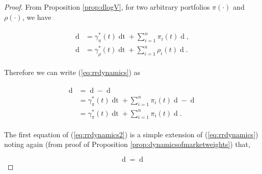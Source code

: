 \documentclass[british]{amsart} \usepackage{lmodern}
\numberwithin{equation}{section} \numberwithin{figure}{section}
\theoremstyle{plain} \newtheorem{thm}{\protect\theoremname}[section]
\theoremstyle{definition} \newtheorem{defn}[thm]{\protect\definitionname}
\theoremstyle{plain} \newtheorem{assumption}[thm]{\protect\assumptionname}
\theoremstyle{plain} \newtheorem{lem}[thm]{\protect\lemmaname}
\theoremstyle{plain} \newtheorem{prop}[thm]{\protect\propositionname}
\theoremstyle{remark} \newtheorem{rem}[thm]{\protect\remarkname}
\theoremstyle{plain} \newtheorem{cor}[thm]{\protect\corollaryname}
\renewcommand{\d}[1]{\mathop{\mathrm{d}{#1}}}
\newcommand{\Vmu}{V^{\mu}}
\begin{document}
\begin{proof}

  From Proposition \ref{prop:dlogV}, for two arbitrary portfolios $\pi(\cdot)$
  and $\rho(\cdot)$, we have

  \begin{gather} 
    \begin{split} 
      \d{\log V^{\pi}(t)} &= 
          \gamma_{\pi}^{*}(t)\d{t} + \sum_{i=1}^{n} \pi_{i}(t)\d{\log{X_{i}(t)}}, \\
      \d{\log V^{\rho}(t)} &= 
          \gamma_{\rho}^{*}(t)\d{t} + \sum_{i=1}^{n} \rho_{i}(t) \d{\log{X_{i}(t)}}.
     \end{split} 
  \end{gather}

  Therefore we can write (\ref{eq:rrdynamics}) as

  \begin{gather*} 
    \begin{split} 
      \d{\log{ \left( \frac{ V^{\pi}(t) }{V^{\rho}(t) } \right) }} 
      &=  \d{\log V^{\pi}(t)} - \d{\log V^{\rho}(t)} \\
      &=  \gamma_{\pi}^{*}(t)\d{t} + \sum_{i=1}^{n} \pi_{i}(t) \d{\log{X_{i}(t)}} -
          \d{\log V^{\rho}(t)} \\
      &=  \gamma_{\pi}^{*}(t)\d{t} + \sum_{i=1}^{n} \pi_{i}(t) 
           \d{\log{ \left( \frac{ X_{i}(t) }{ V^{\rho}(t)} \right) }}.
    \end{split} 
  \end{gather*}

  The first equation of (\ref{eq:rrdynamics2}) is a simple extension of
  (\ref{eq:rrdynamics}) noting again (from proof of Proposition
\ref{prop:dynamicsofmarketweights}) that,

  \begin{equation*} 
      \d{\log{\mu_{i}(t)}} 
        = \d{\log{ \left( \frac{ X_{i}(t) }{ \Vmu(t) } \right)}} 
  \end{equation*}


\end{proof}
\end{document}

